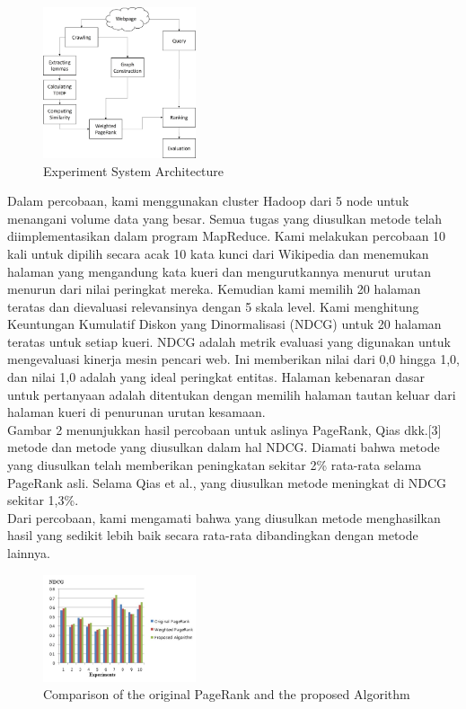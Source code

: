 \documentclass[conference]{IEEEtran}
\begin{document}
\begin{figure}[ht]
    \centering
    \includegraphics[width=0.4\textwidth]{pic2.jpg}
    \caption{Experiment System Architecture}
    \label{fig:logo}
    \end{figure}
Dalam percobaan, kami menggunakan cluster Hadoop dari 5 node untuk
menangani volume data yang besar. Semua tugas yang diusulkan
metode telah diimplementasikan dalam program MapReduce. Kami
melakukan percobaan 10 kali untuk dipilih secara acak 10
kata kunci dari Wikipedia dan menemukan halaman yang mengandung
kata kueri dan mengurutkannya menurut urutan menurun
dari nilai peringkat mereka. Kemudian kami memilih 20 halaman teratas dan
dievaluasi relevansinya dengan 5 skala level. Kami menghitung
Keuntungan Kumulatif Diskon yang Dinormalisasi (NDCG)\cite{schutze2008introduction} untuk
20 halaman teratas untuk setiap kueri. NDCG adalah metrik evaluasi
yang digunakan untuk mengevaluasi kinerja mesin pencari web.
Ini memberikan nilai dari 0,0 hingga 1,0, dan nilai 1,0 adalah yang ideal
peringkat entitas. Halaman kebenaran dasar untuk pertanyaan adalah
ditentukan dengan memilih halaman tautan keluar dari halaman kueri di
penurunan urutan kesamaan.\\

Gambar 2 menunjukkan hasil percobaan untuk aslinya
PageRank, Qias dkk.[3] metode dan metode yang diusulkan
dalam hal NDCG. Diamati bahwa metode yang diusulkan
telah memberikan peningkatan sekitar 2\% rata-rata selama
PageRank asli. Selama Qias et al.\cite{qiao2010simrank}, yang diusulkan
metode meningkat di NDCG sekitar 1,3\%.\\

Dari percobaan, kami mengamati bahwa yang diusulkan
metode menghasilkan hasil yang sedikit lebih baik secara rata-rata
dibandingkan dengan metode lainnya.
\begin{figure}[ht]
    \centering
    \includegraphics[width=0.4\textwidth]{pic1.jpg}
    \caption{Comparison of the original PageRank and the proposed Algorithm}
    \label{fig:logo1}
    \end{figure}
\end{document}
